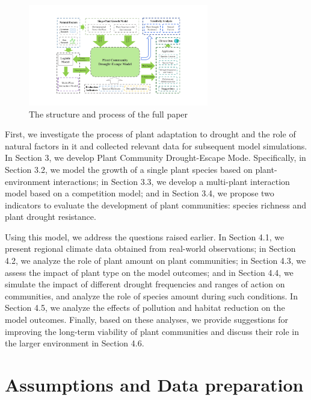 \documentclass[12pt]{article}  %
\begin{document}
\begin{figure}[htbp]
	\centering
	\includegraphics[width=0.7\textwidth]{easymcm/img/work.pdf}
	\caption{The structure and process of the full paper}\label{fig:pic1}
\end{figure}
\vspace{-0.3cm}

First, we investigate the process of plant adaptation to drought and the role of natural factors in it and collected relevant data for subsequent model simulations. In Section 3, we develop Plant Community Drought-Escape Mode. Specifically, in Section 3.2, we model the growth of a single plant species based on plant-environment interactions; in Section 3.3, we develop a multi-plant interaction model based on a competition model; and in Section 3.4, we propose two indicators to evaluate the development of plant communities: species richness and plant drought resistance.

Using this model, we address the questions raised earlier. In Section 4.1, we present regional climate data obtained from real-world observations; in Section 4.2, we analyze the role of plant amount on plant communities; in Section 4.3, we assess the impact of plant type on the model outcomes; and in Section 4.4, we simulate the impact of different drought frequencies and ranges of action on communities, and analyze the role of species amount during such conditions. In Section 4.5, we analyze the effects of pollution and habitat reduction on the model outcomes. Finally, based on these analyses, we provide suggestions for improving the long-term viability of plant communities and discuss their role in the larger environment in Section 4.6.

\vspace{-0.5cm}
\section{Assumptions and Data preparation}
\vspace{-0.5cm}
\end{document}
